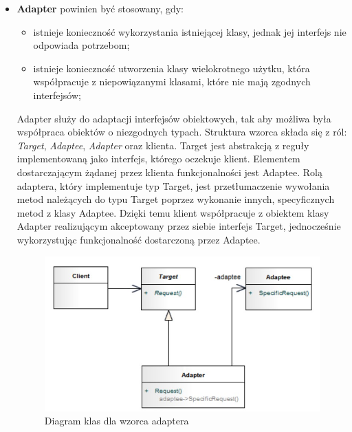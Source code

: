 \documentclass[a4paper,12pt,oneside]{book}
\begin{document}
                \begin{itemize}
                    \item \textbf{Adapter} powinien być stosowany, gdy:
                    \begin{itemize}
                        \item istnieje konieczność wykorzystania istniejącej klasy, jednak jej interfejs nie 
                        odpowiada potrzebom;
                        \item istnieje konieczność utworzenia klasy wielokrotnego użytku, która 
                        współpracuje z niepowiązanymi klasami, które nie mają zgodnych 
                        interfejsów;
                    \end{itemize}
                    Adapter służy do adaptacji interfejsów obiektowych, tak aby możliwa była 
                    współpraca obiektów o niezgodnych typach. Struktura wzorca składa się z ról: \textit{Target}, \textit{Adaptee}, \textit{Adapter} oraz klienta. Target jest abstrakcją z reguły implementowaną jako interfejs, którego oczekuje klient. Elementem dostarczającym żądanej przez klienta funkcjonalności jest Adaptee. Rolą adaptera, który implementuje typ Target, jest przetłumaczenie wywołania metod należących do typu Target poprzez wykonanie innych, specyficznych metod z klasy Adaptee. Dzięki temu klient współpracuje z obiektem klasy Adapter realizującym akceptowany przez siebie interfejs Target, jednocześnie wykorzystując funkcjonalność dostarczoną przez Adaptee.
                    \begin{figure}[h]
                        \centering
                        \includegraphics[width=\textwidth/2]{images/adapter.jpg}
                        \caption{Diagram klas dla wzorca adaptera}
                        \label{fig:twojastara20}
                    \end{figure}

\end{itemize}
\end{document}
